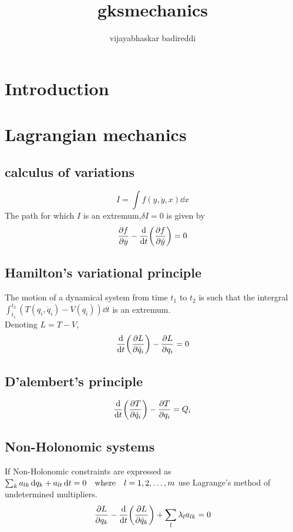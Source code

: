 \documentclass[12pt]{article}
\title{gksmechanics}
\author{vijayabhaskar badireddi}
\begin{document}

\section*{Introduction}

\section*{Lagrangian mechanics}
\subsection*{calculus of variations}
\[I=\int f(y,\dot{y},x)\dd{x}\]
The path for which $I$ is an extremum,$\delta{I}=0$ is given by \[\pdv{f}{y}-\dv{t}\qty(\pdv{f}{\dot{y}})=0\]
\subsection*{Hamilton's variational principle}
The motion of a dynamical system from time $t_1$ to $t_2$ is such that the intergral $\int_{t_1}^{t_2}(T(q_i,\dot{q}_i)-V(q_i))\dd{t}$ is an extremum.\\
Denoting $L=T-V$, \[\dv{t}\qty(\pdv{L}{\dot{q}_i})-\pdv{L}{q_i}=0\]
\subsection*{D'alembert's principle}
\[\dv{t}\qty(\pdv{T}{\dot{q}_i})-\pdv{T}{q_i}=Q_i\]
\subsection*{Non-Holonomic systems}
If Non-Holonomic constraints are expressed as $\sum_ka_{lk}\dd{q_k}+a_{lt}\dd{t}=0\qq{where}l=1,2,\ldots,m$ use Lagrange's method of undetermined multipliers.
\[\pdv{L}{q_k}-\dv{t}\qty(\pdv{L}{\dot{q}_k})+\sum_l\lambda_la_{lk}=0\]
\end{document}
